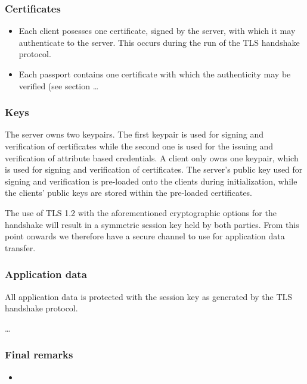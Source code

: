 \subsubsection{Certificates}
\begin{itemize}
	\item Each client posesses one certificate, signed by the server, with which it may authenticate to the server. This occurs during the run of the TLS handshake protocol.
  \item Each passport contains one certificate with which the authenticity may be verified (see section \ldots
\end{itemize}

\subsubsection{Keys}
The server owns two keypairs. The first keypair is used for signing and verification of certificates while the second one is used for the issuing and verification of attribute based credentials. A client only owns one keypair, which is used for signing and verification of certificates. The server's public key used for signing and verification is pre-loaded onto the clients during initialization, while the clients' public keys are stored within the pre-loaded certificates.

The use of TLS 1.2 with the aforementioned cryptographic options for the handshake will result in a symmetric session key held by both parties. From this point onwards we therefore have a secure channel to use for application data transfer.

\subsubsection{Application data}
All application data is protected with the session key as generated by the TLS handshake protocol. 

\ldots


\subsubsection{Final remarks}
\begin{itemize}
  \item 
\end{itemize}


